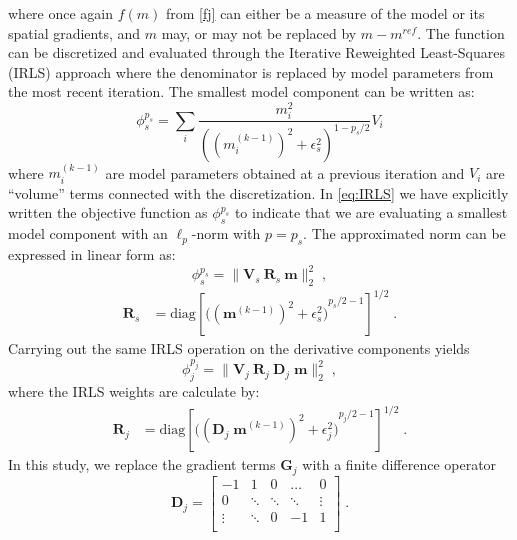 \documentclass[extra,referee]{gji}
\begin{document}
where once again $f(m)$ from \eqref{fj} can either be a measure of the model or its spatial gradients, and $m$ may, or may not be replaced by $m-m^{ref}$.
The function can be discretized and evaluated through the Iterative Reweighted Least-Squares (IRLS) approach where the denominator is replaced by model parameters from the most recent iteration. The smallest model component can be written as:
\begin{equation} \label{eq:IRLS}
\phi_s^{p_s} = \sum_{i}\frac{m_i^2}{{{((m^{(k-1)}_i)^{2} + \epsilon_s^2 )}^{1-p_s/2}} }V_i
\end{equation}
where $m_i^{(k-1)}$ are model parameters obtained at a previous iteration and $V_i$ are “volume” terms connected with the discretization. In \eqref{eq:IRLS} we have explicitly written the objective function as $\phi_s^{p_s}$ to indicate that we are evaluating a smallest model component with an $\ell_p$-norm with
$p=p_s$.
The approximated norm can be expressed in linear form as:
\begin{equation}\label{IRLSphis}
\phi_s^{p_s} = \| \mathbf{V}_s\:\mathbf{R}_s\:\mathbf{m}\|_2^2 \;,
\end{equation}
\begin{equation}\label{eq:R_w}
\begin{split}
	\mathbf{R}_s &= \text{diag} \left[{\Big( {({\mathbf{m}}^{(k-1)})}^{2} + \epsilon_s^2 \Big)}^{p_s/2 - 1} \right]^{1/2} \;.
\end{split}
\end{equation}
Carrying out the same IRLS operation on the derivative components yields
\begin{equation}\label{phixMatrix}
\phi_j^{p_j} = \| \mathbf{V}_j\:\mathbf{R}_j\:\mathbf{D}_j\;\mathbf{m} \|_2^2\;,
\end{equation}
where the IRLS weights are calculate by:
\begin{equation}\label{eq:Rx_w}
\begin{split}
	\mathbf{R}_j &= \text{diag} \left[{\Big( ({{\mathbf{D}_j\;\mathbf{m}}^{(k-1)}})^{2} + \epsilon_j^2 \Big)}^{p_j/2 - 1} \right]^{1/2} \;.
\end{split}
\end{equation}
In this study, we replace the gradient terms $\mathbf{G}_j$ with a finite difference operator
\begin{equation}\label{1D_Grad}
\mathbf{D}_j =
		\begin{bmatrix}
			-1		& 		1	& 	0		& \dots 		& 0 \\
			0 		& 	\ddots	& 	 \ddots	& \ddots 	& \vdots \\
			\vdots	& 		 \ddots	& 0	& -1 & 1\\
		 \end{bmatrix}\;.
\end{equation}
\end{document}
